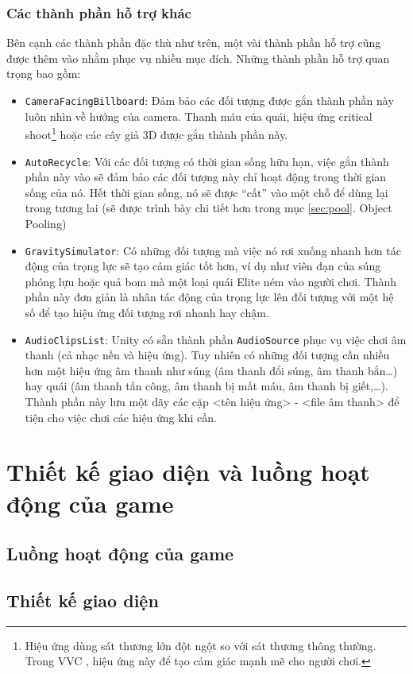 \documentclass[12pt]{report}
\newcommand{\project}{VVC }
\begin{document}
\subsubsection{Các thành phần hỗ trợ khác}
Bên cạnh các thành phần đặc thù như trên, một vài thành phần hỗ trợ cũng được thêm vào nhằm phục vụ nhiều mục đích. Những thành phần hỗ trợ quan trọng bao gồm:
\begin{itemize}
	\item \texttt{CameraFacingBillboard}: Đảm bảo các đối tượng được gắn thành phần này luôn nhìn về hướng của camera. Thanh máu của quái, hiệu ứng critical shoot\footnote{Hiệu ứng dùng sát thương lớn đột ngột so với sát thương thông thường. Trong \project, hiệu ứng này để tạo cảm giác mạnh mẽ cho người chơi.} hoặc các cây giả 3D được gắn thành phần này.
	\item \texttt{AutoRecycle}: Với các đối tượng có thời gian sống hữu hạn, việc gắn thành phần này vào sẽ đảm bảo các đối tượng này chỉ hoạt động trong thời gian sống của nó. Hết thời gian sống, nó sẽ được ``cất'' vào một chỗ để dùng lại trong tương lai (sẽ được trình bày chi tiết hơn trong mục \ref{sec:pool}. Object Pooling)
	\item \texttt{GravitySimulator}: Có những đối tượng mà việc nó rơi xuống nhanh hơn tác động của trọng lực sẽ tạo cảm giác tốt hơn, ví dụ như viên đạn của súng phóng lựu hoặc quả bom mà một loại quái Elite ném vào người chơi. Thành phần này đơn giản là nhân tác động của trọng lực lên đối tượng với một hệ số để tạo hiệu ứng đối tượng rơi nhanh hay chậm.
	\item \texttt{AudioClipsList}: Unity có sẵn thành phần \texttt{AudioSource} phục vụ việc chơi âm thanh (cả nhạc nền và hiệu ứng). Tuy nhiên có những đối tượng cần nhiều hơn một hiệu ứng âm thanh như súng (âm thanh đổi súng, âm thanh bắn\ldots) hay quái (âm thanh tấn công, âm thanh bị mất máu, âm thanh bị giết,\ldots). Thành phần này lưu một dãy các cặp <tên hiệu ứng> - <file âm thanh> để tiện cho việc chơi các hiệu ứng khi cần.
\end{itemize}

\section{Thiết kế giao diện và luồng hoạt động của game}
\subsection{Luồng hoạt động của game}
\subsection{Thiết kế giao diện}
\end{document}
